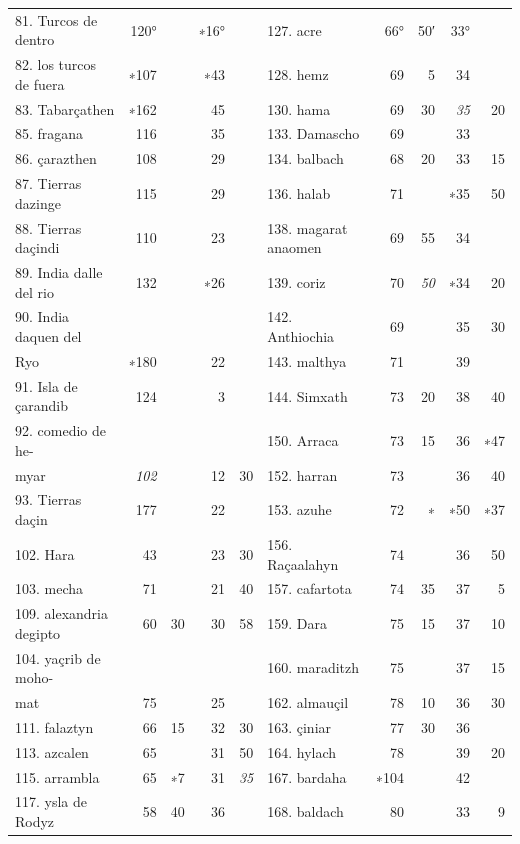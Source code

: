 \documentclass[11pt]{article}
\newcommand{\Pg}[1]{\marginpar{\footnotesize\color{gray}#1}}
\begin{document}
\Pg{II 216}\begin{center}\small\begin{tabular}{lrrrrlrrrr}
81. Turcos de dentro & 120° &  & ∗16° &  & 127. acre & 66° & 50′ & 33° &  \\
82. los turcos de fuera & ∗107 &  & ∗43 &  & 128. hemz & 69 & 5 & 34 &  \\
83. Tabarçathen & ∗162 &  & 45 &  & 130. hama & 69 & 30 & \emph{35} & 20 \\
85. fragana & 116 &  & 35 &  & 133. Damascho & 69 &  & 33 &  \\
86. çarazthen & 108 &  & 29 &  & 134. balbach & 68 & 20 & 33 & 15 \\
87. Tierras dazinge & 115 &  & 29 &  & 136. halab & 71 &  & ∗35 & 50 \\
88. Tierras daçindi & 110 &  & 23 &  & 138. magarat anaomen & 69 & 55 & 34 &  \\
89. India dalle del rio & 132 &  & ∗26 &  & 139. coriz & 70 & \emph{50} & ∗34 & 20 \\
90. India daquen del &  &  &  &  & 142. Anthiochia & 69 &  & 35 & 30 \\
Ryo & ∗180 &  & 22 &  & 143. malthya & 71 &  & 39 &  \\
91. Isla de çarandib & 124 &  & 3 &  & 144. Simxath & 73 & 20 & 38 & 40 \\
92. comedio de he- &  &  &  &  & 150. Arraca & 73 & 15 & 36 & ∗47 \\
myar & \emph{102} &  & 12 & 30 & 152. harran & 73 &  & 36 & 40 \\
93. Tierras daçin & 177 &  & 22 &  & 153. azuhe & 72 & ∗ & ∗50 & ∗37 \\
102. Hara & 43 &  & 23 & 30 & 156. Raçaalahyn & 74 &  & 36 & 50 \\
103. mecha & 71 &  & 21 & 40 & 157. cafartota & 74 & 35 & 37 & 5 \\
109. alexandria degipto & 60 & 30 & 30 & 58 & 159. Dara & 75 & 15 & 37 & 10 \\
104. yaçrib de moho- &  &  &  &  & 160. maraditzh & 75 &  & 37 & 15 \\
mat & 75 &  & 25 &  & 162. almauçil & 78 & 10 & 36 & 30 \\
111. falaztyn & 66 & 15 & 32 & 30 & 163. çiniar & 77 & 30 & 36 &  \\
113. azcalen & 65 &  & 31 & 50 & 164. hylach & 78 &  & 39 & 20 \\
115. arrambla & 65 & ∗7 & 31 & \emph{35} & 167. bardaha & ∗104 &  & 42 &  \\
117. ysla de Rodyz & 58 & 40 & 36 &  & 168. baldach & 80 &  & 33 & 9 \\

\end{tabular}
\end{center}
\end{document}
